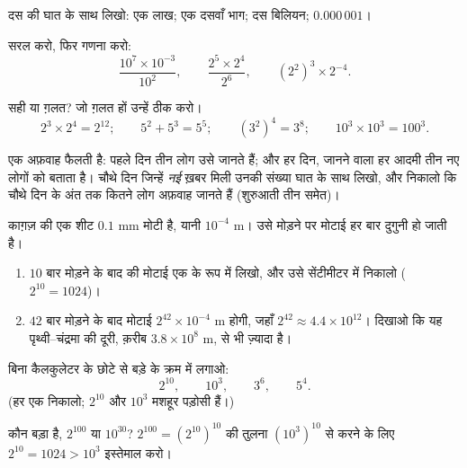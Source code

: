 \begin{exercise}[$\star$]\label{exo:g8:powers:5}
दस की घात के साथ लिखो: एक लाख; एक दसवाँ भाग; दस बिलियन;
$0.000\,001$।
\end{exercise}

\begin{exercise}[$\star$]\label{exo:g8:powers:6}
सरल करो, फिर गणना करो:
\[
\frac{10^7 \times 10^{-3}}{10^2},
\qquad
\frac{2^5 \times 2^4}{2^6},
\qquad
\left(2^2\right)^3 \times 2^{-4} .
\]
\end{exercise}

\begin{exercise}[$\star$]\label{exo:g8:powers:7}
सही या ग़लत? जो ग़लत हों उन्हें ठीक करो।
\[
2^3 \times 2^4 = 2^{12}; \qquad
5^2 + 5^3 = 5^5; \qquad
(3^2)^4 = 3^8; \qquad
10^3 \times 10^3 = 100^3 .
\]
\end{exercise}

\begin{exercise}[$\star\star$]\label{exo:g8:powers:8}
एक अफ़वाह फैलती है: पहले दिन तीन लोग उसे जानते हैं; और हर दिन,
जानने वाला हर आदमी तीन नए लोगों को बताता है। चौथे दिन जिन्हें
\emph{नई} ख़बर मिली उनकी संख्या घात के साथ लिखो, और निकालो कि चौथे
दिन के अंत तक कितने लोग अफ़वाह जानते हैं (शुरुआती तीन समेत)।
\end{exercise}

\begin{exercise}[$\star\star$]\label{exo:g8:powers:9}
काग़ज़ की एक शीट $0.1$ mm मोटी है, यानी $10^{-4}$ m। उसे मोड़ने पर
मोटाई हर बार दुगुनी हो जाती है।
\begin{enumerate}
  \item $10$ बार मोड़ने के बाद की मोटाई एक  के रूप में लिखो,
        और उसे सेंटीमीटर में निकालो ($2^{10} = 1024$)।
  \item $42$ बार मोड़ने के बाद मोटाई $2^{42} \times 10^{-4}$ m होगी,
        जहाँ $2^{42} \approx 4.4 \times 10^{12}$। दिखाओ कि यह
        पृथ्वी--चंद्रमा की दूरी, क़रीब $3.8 \times 10^8$ m, से भी
        ज़्यादा है।
\end{enumerate}
\end{exercise}

\begin{exercise}[$\star\star$]\label{exo:g8:powers:10}
बिना कैलकुलेटर के छोटे से बड़े के क्रम में लगाओ:
\[
2^{10}, \qquad 10^3, \qquad 3^6, \qquad 5^4 .
\]
(हर एक निकालो; $2^{10}$ और $10^3$ मशहूर पड़ोसी हैं।)
\end{exercise}

\begin{exercise}[$\star\star\star$]\label{exo:g8:powers:11}
कौन बड़ा है, $2^{100}$ या $10^{30}$?
$2^{100} = \left(2^{10}\right)^{10}$ की तुलना
$\left(10^3\right)^{10}$ से करने के लिए $2^{10} = 1024 > 10^3$
इस्तेमाल करो।
\end{exercise}

